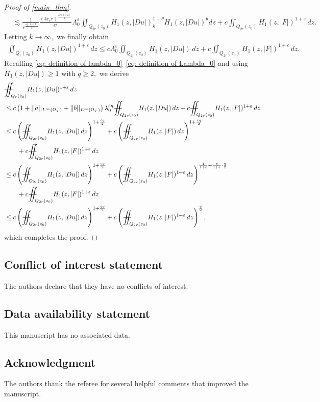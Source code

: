 \documentclass[11pt,oneside, english,reqno,twoside a4paper]{amsart}
\theoremstyle{definition}
\numberwithin{theorem}{section}
\numberwithin{equation}{section}
\newcommand{\apprle}{\lesssim}
\newcommand{\iintss}{{\int\hspace{-0.28cm}\int}}
\newcommand{ \miints }{{\iintss\hspace{-0.56cm} -\hspace{-0.15cm}-}}
\newcommand{\miint}[1]{{\miints_{\hspace{-0.13cm}#1}}}
\begin{document}
\begin{proof}[Proof of \cref{main_thm}]
\begin{align*}
&\apprle\frac{1}{r^{\frac{\varepsilon q(n+2)}{2}}}\frac{(4c_v r)^{\frac{\varepsilon q(n+2)}{2}}}{c^{\varepsilon}} \Lambda^{\varepsilon}_0 \iint_{Q_{2r}(z_0)}H_1(z, |D u|)_k^{1-\theta}H_1(z, |D u|)^\theta dz+ c \iint_{Q_{2r}(z_0)}H_1(z, |F|)^{1+\varepsilon}\,dz.
\end{align*}
Letting $k \to \infty,$ we finally obtain
\begin{align*}
  \iint_{Q_{r}(z_0)} H_1(z, |D u|)^{1+\varepsilon}\, dz \leq c \Lambda^{\varepsilon}_0 \iint_{Q_{2r}(z_0)}H_1(z, |D u|)\,dz+c \iint_{Q_{2r}(z_0)}H_1(z, |F|)^{1+\varepsilon}\,dz.
\end{align*}
Recalling \eqref{eq: definition of lambda_0}--\eqref{eq: definition of Lambda_0} and using $H_1(z, |Du|)\geq 1$ with $q\geq 2,$ we derive
\begin{align*}
    &\miint{Q_{r}(z_0)}H_1(z, |Du|)^{1+\varepsilon}\, dz\\
    &\leq c \left(1+||a||_{L^{\infty}(\Omega_T)}+||b||_{L^{\infty}(\Omega_T)}\right)\lambda^{\varepsilon q}_0\miint{Q_{2r}(z_0)}H_1(z, |Du|)\, dz+ c\miint{Q_{2r}(z_0)}H_1(z, |F|)^{1+\varepsilon}\, dz\\
    &\leq c \left(\miint{Q_{2r}(z_0)}H_1(z, |D u|)\,dz\right)^{1+\frac{\varepsilon q}{2}}+c\left(\miint{Q_{2r}(z_0)}H_1(z, |F|)\, dz\right)^{1+\frac{\varepsilon q}{2}}\\
    &\qquad + c\miint{Q_{2r}(z_0)}H_1(z, |F|)^{1+\varepsilon}\, dz\\
    &\leq c \left(\miint{Q_{2r}(z_0)}H_1(z, |D u|)\,dz\right)^{1+\frac{\varepsilon q}{2}}+c\left(\miint{Q_{2r}(z_0)}H_1(z, |F|)^{1+\varepsilon}\, dz\right)^{\frac{1}{1+\varepsilon}+\frac{\varepsilon}{1+\varepsilon}\cdot \frac{q}{2}}\\
    &\qquad + c\miint{Q_{2r}(z_0)}H_1(z, |F|)^{1+\varepsilon}\, dz\\
    &\leq c \left(\miint{Q_{2r}(z_0)}H_1(z, |D u|)\,dz\right)^{1+\frac{\varepsilon q}{2}}+c\left(\miint{Q_{2r}(z_0)}H_1(z, |F|)^{1+\varepsilon}\, dz\right)^{\frac{q}{2}}, 
\end{align*}
which completes the proof.
\end{proof}


\subsection*{Conflict of interest statement} The authors declare that they have no conflicts of interest.


\subsection*{Data availability statement} This manuscript has no associated data.

\subsection*{Acknowledgment} The authors thank the referee for several helpful comments that improved the manuscript.




\end{document}
